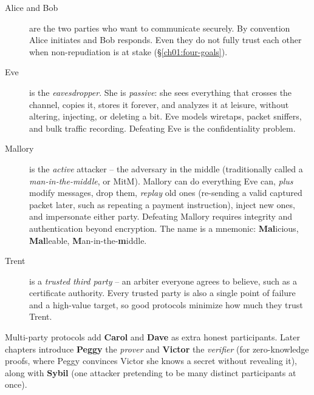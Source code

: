 \begin{description}
  \item[Alice and Bob] are the two parties who want to communicate securely. By convention Alice initiates and Bob responds. Even they do not fully trust each other when non-repudiation is at stake (\S\ref{ch01:four-goals}).
  \item[Eve] is the \emph{eavesdropper}. She is \emph{passive}: she sees everything that crosses the channel, copies it, stores it forever, and analyzes it at leisure, without altering, injecting, or deleting a bit. Eve models wiretaps, packet sniffers, and bulk traffic recording. Defeating Eve is the confidentiality problem.
  \item[Mallory] is the \emph{active} attacker -- the adversary in the middle (traditionally called a \emph{man-in-the-middle}, or MitM). Mallory can do everything Eve can, \emph{plus} modify messages, drop them, \emph{replay} old ones (re-sending a valid captured packet later, such as repeating a payment instruction), inject new ones, and impersonate either party. Defeating Mallory requires integrity and authentication beyond encryption. The name is a mnemonic: \textbf{Mal}icious, \textbf{Mal}leable, \textbf{M}an-in-the-\textbf{m}iddle.
  \item[Trent] is a \emph{trusted third party} -- an arbiter everyone agrees to believe, such as a certificate authority. Every trusted party is also a single point of failure and a high-value target, so good protocols minimize how much they trust Trent.
\end{description}

Multi-party protocols add \textbf{Carol} and \textbf{Dave} as extra honest participants. Later chapters introduce \textbf{Peggy} the \emph{prover} and \textbf{Victor} the \emph{verifier} (for zero-knowledge proofs, where Peggy convinces Victor she knows a secret without revealing it), along with \textbf{Sybil} (one attacker pretending to be many distinct participants at once).

